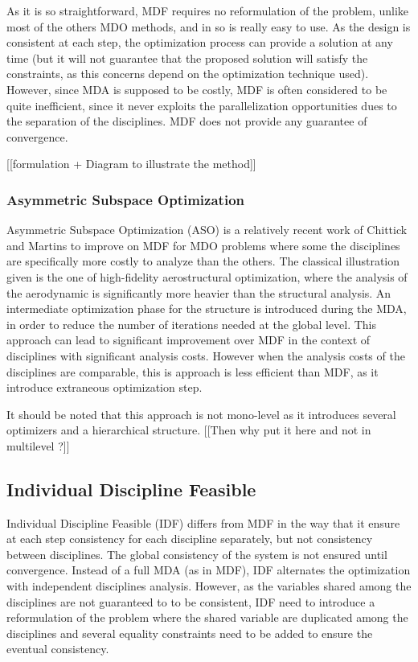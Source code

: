 As it is so straightforward, MDF requires no reformulation of the problem, unlike most of the others MDO methods, and in so is really easy to use. As the design is consistent at each step, the optimization process can provide a solution at any time (but it will not guarantee that the proposed solution will satisfy the constraints, as this concerns depend on the optimization technique used). However, since MDA is supposed to be costly, MDF is often considered to be quite inefficient, since it never exploits the parallelization opportunities dues to the separation of the disciplines. MDF does not provide any guarantee of convergence.

[[formulation + Diagram to illustrate the method]]


\subsubsection{Asymmetric Subspace Optimization}

Asymmetric Subspace Optimization (ASO) is a relatively recent work of Chittick and Martins\cite{Chittick:2007:B} to improve on MDF for MDO problems where some the disciplines are specifically more costly to analyze than the others. The classical illustration given is the one of high-fidelity aerostructural optimization, where the analysis of the aerodynamic is significantly more heavier than the structural analysis. An intermediate optimization phase for the structure is introduced during the MDA, in order to reduce the number of iterations needed at the global level.
This approach can lead to significant improvement over MDF in the context of disciplines with significant analysis costs. However when the analysis costs of the disciplines are comparable, this is approach is less efficient than MDF, as it introduce extraneous optimization step.

It should be noted that this approach is not mono-level as it introduces several optimizers and a hierarchical structure. [[Then why put it here and not in multilevel ?]] 

\subsection{Individual Discipline Feasible}

Individual Discipline Feasible (IDF) differs from MDF in the way that it ensure at each step consistency for each discipline separately, but not consistency between disciplines. The global consistency of the system is not ensured until convergence.
Instead of a full MDA (as in MDF), IDF alternates the optimization with independent disciplines analysis.
However, as the variables shared among the disciplines are not guaranteed to to be consistent, IDF need to introduce a reformulation of the problem where the shared variable are duplicated among the disciplines and several equality constraints need to be added to ensure the eventual consistency.

